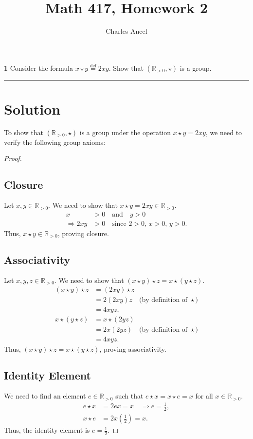 \documentclass[12pt]{amsart}
\title{Math 417, Homework 2}
\author{Charles Ancel}
\theoremstyle{definition}
\numberwithin{equation}{section}
\newcommand{\R}{\mathbb{R}}
\begin{document}
\maketitle

\begin{exercise}{\textbf{1}} Consider the formula \(x \star y \stackrel{\text{def}}{=} 2xy \). Show that \((\R_{>0}, \star)\) is a group.
    
    \noindent\rule{\linewidth}{1pt}

    \vspace*{-10pt}\section*{Solution}
    To show that \((\R_{>0}, \star)\) is a group under the operation \(x \star y = 2xy\), we need to verify the following group axioms:
\begin{proof} \( \)
\subsection*{Closure}
Let \(x, y \in \R_{>0}\). We need to show that \(x \star y = 2xy \in \R_{>0}\).
\begin{align*}
x &> 0 \quad \text{and} \quad y > 0 \\
\Rightarrow 2xy &> 0 \quad \text{since } 2 > 0, \, x > 0, \, y > 0.
\end{align*}
Thus, \(x \star y \in \R_{>0}\), proving closure.

\subsection*{Associativity}
Let \(x, y, z \in \R_{>0}\). We need to show that \((x \star y) \star z = x \star (y \star z)\).
\begin{align*}
(x \star y) \star z &= (2xy) \star z \\
                    &= 2(2xy)z \quad \text{(by definition of } \star\text{)} \\
                    &= 4xyz, \\
x \star (y \star z) &= x \star (2yz) \\
                    &= 2x(2yz) \quad \text{(by definition of } \star\text{)} \\
                    &= 4xyz.
\end{align*}
Thus, \((x \star y) \star z = x \star (y \star z)\), proving associativity.

\subsection*{Identity Element}
We need to find an element \(e \in \R_{>0}\) such that \(e \star x = x \star e = x\) for all \(x \in \R_{>0}\).
\begin{align*}
e \star x &= 2ex = x \quad \Rightarrow e = \frac{1}{2}, \\
x \star e &= 2x \left(\frac{1}{2}\right) = x.
\end{align*}
Thus, the identity element is \(e = \frac{1}{2}\).


\end{proof}
\end{exercise}
\end{document}
